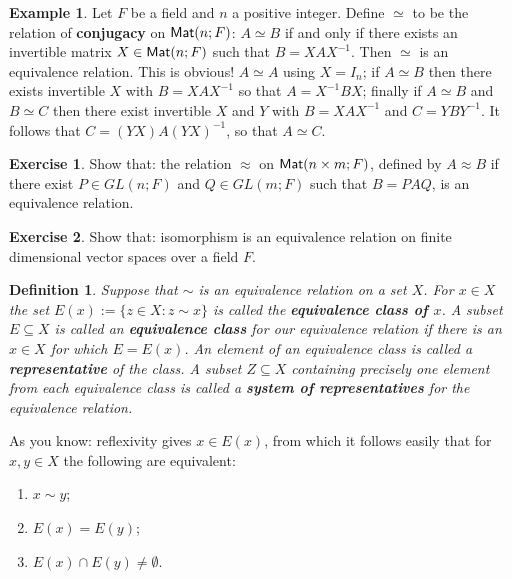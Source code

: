 \documentclass[11pt]{amsbook}
\newtheorem{definition}[theorem]{Definition}
\theoremstyle{definition}
\newtheorem{ex}[theorem]{Example}
\newtheorem{exercise}{Exercise}
\begin{document}
\begin{ex}\label{conjugacy}
Let $F$ be a field and $n$ a positive integer. Define $\simeq$ to be the relation of {\bf conjugacy} on ${\sf Mat}(n; F)$: $A\simeq B$ if and only if there exists an invertible matrix $X\in {\sf Mat}(n;F)$ such that $B = XAX^{-1}$. Then $\simeq$ is an equivalence relation. This is obvious! $A\simeq A$ using $X = I_n$; if $A\simeq B$ then there exists invertible $X$ with $B= XAX^{-1}$ so that $A = X^{-1}BX$; finally if $A\simeq B$ and $B\simeq C$ then there exist invertible $X$ and $Y$ with $B = XAX^{-1}$ and $C= YBY^{-1}$. It follows that $C = (YX) A (YX)^{-1}$, so that $A\simeq C$.
\end{ex}

\begin{exercise}
\label{snfeq}
Show that: the relation $\approx$ on ${\sf Mat}(n\times m; F)$, defined by $A\approx B$ if there exist $P\in GL(n; F)$ and $Q\in GL(m;F)$ such that $B = PAQ$, is an equivalence relation.
\end{exercise}

\begin{exercise}
\label{imvseq}
Show that: isomorphism is an equivalence relation on finite dimensional vector spaces over a field $F$.
\end{exercise}

\begin{definition}
\label{thisneedsalabel}
Suppose that $\sim$ is an equivalence relation on a set $X$. For $x\in X$ the set $E(x) := \{ z\in X: z\sim x\}$ is called the {\bf equivalence class of $x$}. A subset $E\subseteq X$ is called an {\bf equivalence class} for our equivalence relation if there is an $x\in X$ for which $E = E(x)$. An element of an equivalence class is called a {\bf representative} of the class. A subset $Z\subseteq X$ containing precisely one element from each equivalence class is called a {\bf system of representatives} for the equivalence relation.
\end{definition}

\label{equivclasspartition}
As you know: reflexivity gives $x\in E(x)$, from which it follows easily that for $x,y\in X$ the following are equivalent:
\begin{enumerate}
\item $x\sim y$;
\item $E(x) = E(y)$;
\item $E(x)\cap E(y)\neq \emptyset$.
\end{enumerate}
\end{document}
